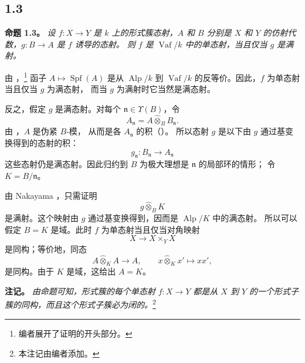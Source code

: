 
\subsection*{1.3}
\label{sga3:VIIB:1.3}

\noindent\textbf{命题 1.3。}
\label{sga3:VIIB:1.3.prop}
{\itshape 设 \(f:X\to Y\) 是 \(k\) 上的形式簇态射，\(A\) 和 \(B\) 分别是
\(X\) 和 \(Y\) 的仿射代数，\(g:B\to A\) 是 \(f\) 诱导的态射。
则 \(f\) 是 \(\operatorname{Vaf}/k\) 中的单态射，当且仅当 \(g\) 是满射。}

由 ，\footnote{编者展开了证明的开头部分。}
函子 \(A\mapsto\operatorname{Spf}(A)\) 是从 \(\operatorname{Alp}/k\) 到
\(\operatorname{Vaf}/k\) 的反等价。因此，\(f\) 为单态射当且仅当 \(g\) 为满态射，
而当 \(g\) 为满射时它当然是满态射。

反之，假定 \(g\) 是满态射。对每个 \(\mathfrak n\in\Upsilon(B)\)，令
\[
  A_{\mathfrak n}
  =
  A\widehat{\otimes}_B B_{\mathfrak n}.
\]
由 ，\(A\) 是伪紧 \(B\)-模，
从而是各 \(A_{\mathfrak n}\) 的积\textup{（）}。
所以态射 \(g\) 是以下由 \(g\) 通过基变换得到的态射的积：
\[
  g_{\mathfrak n}:B_{\mathfrak n}\longrightarrow A_{\mathfrak n}
\]
这些态射仍是满态射。因此归约到 \(B\) 为极大理想是 \(\mathfrak n\) 的局部环的情形；
令 \(K=B/\mathfrak n\)。

由 Nakayama ，只需证明
\[
  g\widehat{\otimes}_B K
\]
是满射。这个映射由 \(g\) 通过基变换得到，因而是 \(\operatorname{Alp}/K\) 中的满态射。
所以可以假定 \(B=K\) 是域。此时 \(f\) 为单态射当且仅当对角映射
\[
  X\longrightarrow X\times_YX
\]
是同构；等价地，同态
\[
  A\widehat{\otimes}_K A\longrightarrow A,
  \qquad
  x\widehat{\otimes}_Kx'\longmapsto xx',
\]
是同构。由于 \(K\) 是域，这给出 \(A=K\)。

\medskip
\noindent\textbf{注记。}
\label{sga3:VIIB:1.3.remark}
{\itshape 由命题可知，形式簇的每个单态射 \(f:X\to Y\) 都是从 \(X\) 到
\(Y\) 的一个形式子簇的同构，而且这个形式子簇必为闭的。}\footnote{本注记由编者添加。}


